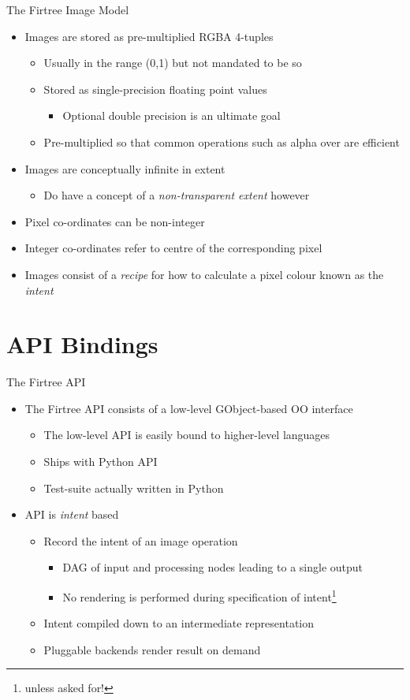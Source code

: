 \documentclass{beamer}
\newcommand{\bi}{\begin{itemize}}
\newcommand{\ei}{\end{itemize}}
\begin{document}
\begin{frame}{The Firtree Image Model}
  \bi
    \item Images are stored as pre-multiplied RGBA 4-tuples
    \bi
      \item Usually in the range (0,1) but not mandated to be so
      \item Stored as single-precision floating point values
      \bi
        \item Optional double precision is an ultimate goal
      \ei
      \item Pre-multiplied so that common operations such as alpha over are
      efficient
    \ei
    \item Images are conceptually infinite in extent
    \bi
      \item Do have a concept of a \emph{non-transparent extent} however
    \ei
    \item Pixel co-ordinates can be non-integer
    \item Integer co-ordinates refer to centre of the corresponding pixel
    \item Images consist of a \emph{recipe} for how to calculate a pixel
    colour known as the \emph{intent}
  \ei
\end{frame}


\section{API Bindings} %

\begin{frame}{The Firtree API}
  \bi
    \item The Firtree API consists of a low-level GObject-based OO interface
    \bi
      \item The low-level API is easily bound to higher-level languages
      \item Ships with Python API
      \item Test-suite actually written in Python
    \ei
    \item API is \emph{intent} based
    \bi
      \item Record the intent of an image operation
      \bi
        \item DAG of input and processing nodes leading to a single output
        \item No rendering is performed during specification of
        intent\footnote{unless asked for!}
      \ei
      \item Intent compiled down to an intermediate representation
      \item Pluggable backends render result on demand
    \ei
  \ei
\end{frame}
\end{document}
